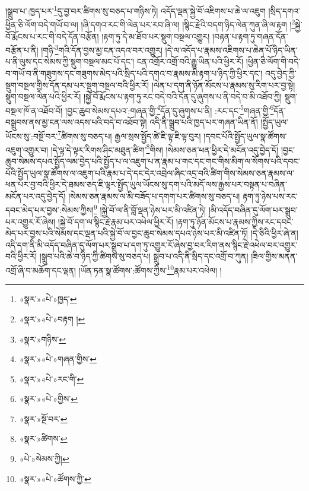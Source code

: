།སྒྲུབ་པ་:ཁྱད་པར་\footnote{«སྣར་»«པེ་»ཁྱད་}དུ་བྱ་བར་ཚིགས་སུ་བཅད་པ་གཉིས་ཏེ། འདོད་ལྡན་སྐྱེ་བོ་འཇིགས་པ་ཆེ་ལ་འཇུག །སྲིད་དགའ་ཕྱིན་ཅི་ལོག་བདེ་གཡོ་བ་ལ། །ཞི་དགའ་རང་གི་ལེན་པར་རབ་ཞི་ལ། །སྙིང་རྗེའི་བདག་ཉིད་ལེན་ཀུན་ཞི་ལ་རྟག །\footnote{«སྣར་»«པེ་»བརྟག །}སྐྱེ་བོ་རྨོངས་པ་རང་གི་བདེ་དོན་བརྩོན། །རྟག་ཏུ་དེ་མ་ཐོབ་པར་སྡུག་བསྔལ་འགྱུར། །བརྟན་པ་རྟག་ཏུ་གཞན་དོན་བརྩོན་པ་ནི། །གཉི་\footnote{«སྣར་»གཉིས་}གའི་དོན་བྱས་མྱ་ངན་འདའ་བར་འགྱུར། །དེ་ལ་འདོད་པ་རྣམས་འཇིགས་པ་ཆེན་པོ་ཉིད་ཡིན་པ་ནི་ལུས་དང་སེམས་ཀྱི་སྡུག་བསྔལ་མང་པོ་དང་། ངན་འགྲོར་འགྲོ་བའི་རྒྱུ་ཡིན་པའི་ཕྱིར་རོ། །ཕྱིན་ཅི་ལོག་གི་བདེ་བ་གཡོ་བ་ནི་གཟུགས་དང་གཟུགས་མེད་པའི་སྲིད་པའི་དགའ་བ་རྣམས་མི་རྟག་པ་ཉིད་ཀྱི་ཕྱིར་དང་། འདུ་བྱེད་ཀྱི་སྡུག་བསྔལ་གྱིས་དོན་དམ་པར་སྡུག་བསྔལ་བའི་ཕྱིར་རོ། །ལེན་པ་དག་ནི་ཉོན་མོངས་པ་རྣམས་སུ་རིག་པར་བྱ་སྟེ། སྡུག་བསྔལ་ལེན་པའི་ཕྱིར་རོ། །སྐྱེ་བོ་རྨོངས་པ་རྟག་ཏུ་རང་བདེ་བའི་དོན་དུ་ཞུགས་པ་ནི་བདེ་བ་མི་འཐོབ་ཀྱི། སྡུག་བསྔལ་ཁོ་ན་འཐོབ་བོ། །བྱང་ཆུབ་སེམས་དཔའ་:གཞན་གྱི་\footnote{«སྣར་»«པེ་»གཞན་གྱིས་}དོན་དུ་ཞུགས་པ་ནི། :རང་དང་\footnote{«སྣར་»«པེ་»རང་གི་}གཞན་གྱི་\footnote{«སྣར་»«པེ་»གྱིས་}དོན་བསྒྲུབས་ནས་མྱ་ངན་ལས་འདས་པའི་བདེ་བ་འཐོབ་སྟེ། འདི་ནི་སྒྲུབ་པའི་ཁྱད་པར་གཞན་ཡིན་ནོ། །སྤྱོད་ཡུལ་ཡོངས་སུ་:བསྔོ་བར་\footnote{«སྣར་»སྔོ་བར་}ཚིགས་སུ་བཅད་པ། རྒྱལ་སྲས་སྤྱོད་ཚེ་ཇི་ལྟ་ཇི་ལྟ་བུར། །དབང་པོའི་སྤྱོད་ཡུལ་སྣ་ཚོགས་འཇུག་འགྱུར་བ། །དེ་ལྟ་དེ་ལྟར་རིགས་ཤིང་མཐུན་ཚིག་\footnote{«སྣར་»ཚིགས་}གིས། །སེམས་ཅན་ཕན་ཕྱིར་དེ་མངོན་འདུ་བྱེད་དོ། །བྱང་ཆུབ་སེམས་དཔའ་སྤྱོད་ལམ་བྱེད་པའི་སྤྱོད་པ་ལ་འཇུག་པ་ན་རྣམ་པ་གང་དང་གང་གིས་མིག་ལ་སོགས་པའི་དབང་པོའི་སྤྱོད་ཡུལ་སྣ་ཚོགས་ལ་འཇུག་པའི་རྣམ་པ་དེ་དང་དེར་འབྲེལ་ཞིང་འདྲ་བའི་ཚིག་གིས་སེམས་ཅན་རྣམས་ལ་ཕན་པར་བྱ་བའི་ཕྱིར་དེ་ཐམས་ཅད་ཇི་ལྟར་སྤྱོད་ཡུལ་ཡོངས་སུ་དག་པའི་མདོ་ལས་རྒྱས་པར་བསྟན་པ་བཞིན་མངོན་པར་འདུ་བྱེད་དོ། །སེམས་ཅན་རྣམས་ལ་མི་བཟོད་པ་དགག་པར་ཚིགས་སུ་བཅད་པ། རྟག་ཏུ་ཉེས་པས་རང་དབང་མེད་པར་བྱས་:སེམས་ཀྱིས།\footnote{«པེ་»སེམས་ཀྱི།} །སྐྱེ་བོ་ལ་ནི་བློ་ལྡན་ཉེས་པར་མི་འཛིན་ཏེ། །མི་འདོད་བཞིན་དུ་ལོག་པར་སྒྲུབ་པར་འགྱུར་རོ་ཞེས། །སྐྱེ་བོ་དག་ལ་སྙིང་རྗེ་རྣམ་པར་འཕེལ་ཕྱིར་རོ། །རྟག་ཏུ་ཉོན་མོངས་པ་རྣམས་ཀྱིས་རང་དབང་མེད་པར་བྱས་པའི་སེམས་དང་ལྡན་པའི་སྐྱེ་བོ་ལ་བྱང་ཆུབ་སེམས་དཔའ་ཉེས་པར་མི་འཛིན་ཏོ། །དེ་ཅིའི་ཕྱིར་ཞེ་ན། འདི་དག་ནི་མི་འདོད་བཞིན་དུ་ལོག་པར་སྒྲུབ་པ་དག་ཏུ་འགྱུར་རོ་ཞེས་བྱ་བར་རིག་ནས་སྙིང་རྗེ་འཕེལ་བར་འགྱུར་བའི་ཕྱིར་རོ། །སྒྲུབ་པའི་ཆེ་བ་ཉིད་ཀྱི་ཚིགས་སུ་བཅད་པ། སྒྲུབ་པ་འདི་ནི་སྲིད་དང་འགྲོ་བ་ཀུན། །ཟིལ་གྱིས་མནན་འགྲོ་ཞི་བ་མཆོག་དང་ལྡན། །ཡོན་ཏན་སྣ་ཚོགས་:ཚོགས་ཀྱིས་\footnote{«སྣར་»«པེ་»ཚོགས་ཀྱི་}རྣམ་པར་འཕེལ། །
